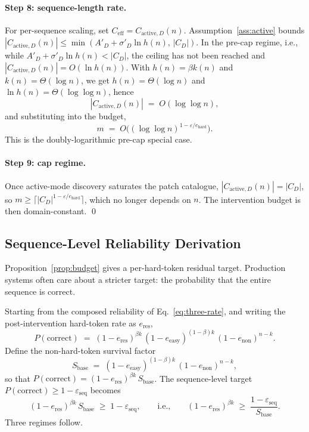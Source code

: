 \documentclass{article}
\theoremstyle{taeplain}
\theoremstyle{taedefn}
\begin{document}
\paragraph{Step 8: sequence-length rate.}
For per-sequence scaling, set $C_{\text{eff}} = C_{\text{active},D}(n)$. Assumption~\ref{ass:active} bounds $|C_{\text{active},D}(n)| \leq \min(A'_D + \sigma'_D \ln h(n),\, |C_D|)$. In the pre-cap regime, i.e., while $A'_D + \sigma'_D \ln h(n) < |C_D|$, the ceiling has not been reached and $|C_{\text{active},D}(n)| = O(\ln h(n))$. With $h(n) = \beta k(n)$ and $k(n) = \Theta(\log n)$, we get $h(n) = \Theta(\log n)$ and $\ln h(n) = \Theta(\log\log n)$, hence
\[
|C_{\text{active},D}(n)| \;=\; O(\log\log n),
\]
and substituting into the budget,
\[
m \;=\; O\!\bigl((\log\log n)^{1 - \varepsilon / e_{\text{hard}}}\bigr).
\]
This is the doubly-logarithmic pre-cap special case.

\paragraph{Step 9: cap regime.}
Once active-mode discovery saturates the patch catalogue, $|C_{\text{active},D}(n)| = |C_D|$, so $m \geq \lceil |C_D|^{1 - \varepsilon / e_{\text{hard}}} \rceil$, which no longer depends on $n$. The intervention budget is then domain-constant. \qed

\subsection{Sequence-Level Reliability Derivation}
\label{app:seq-level}

Proposition~\ref{prop:budget} gives a per-hard-token residual target. Production systems often care about a stricter target: the probability that the entire sequence is correct.

Starting from the composed reliability of Eq.~\eqref{eq:three-rate}, and writing the post-intervention hard-token rate as $e_{\text{res}}$,
\[
P(\text{correct}) \;=\; (1 - e_{\text{res}})^{\beta k}\,(1 - e_{\text{easy}})^{(1 - \beta) k}\,(1 - e_{\text{non}})^{n - k}.
\]
Define the non-hard-token survival factor
\begin{equation}\label{eq:Sbase}
S_{\text{base}} \;=\; (1 - e_{\text{easy}})^{(1 - \beta) k}\,(1 - e_{\text{non}})^{n - k},
\end{equation}
so that $P(\text{correct}) = (1 - e_{\text{res}})^{\beta k}\, S_{\text{base}}$. The sequence-level target $P(\text{correct}) \geq 1 - \varepsilon_{\text{seq}}$ becomes
\[
(1 - e_{\text{res}})^{\beta k}\, S_{\text{base}} \;\geq\; 1 - \varepsilon_{\text{seq}},
\qquad\text{i.e.,}\qquad
(1 - e_{\text{res}})^{\beta k} \;\geq\; \frac{1 - \varepsilon_{\text{seq}}}{S_{\text{base}}}.
\]
Three regimes follow.
\end{document}
